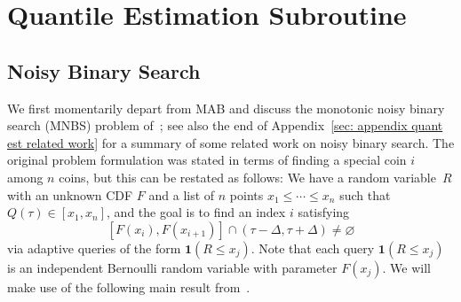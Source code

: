 \section{Quantile Estimation Subroutine}
\label{sec: appendix QuantEst}

\subsection{Noisy Binary Search}
\label{sec: appendix MNBS reformulation}
We first momentarily depart from MAB and discuss the monotonic noisy binary search (MNBS) problem of~\cite{karp2007noisy}; see also the end of Appendix~\ref{sec: appendix quant est related work} for a summary of some related work on noisy binary search.
The original problem formulation was stated in terms of finding a special coin $i$ among $n$ coins, but this can be restated as follows: 
We have a random variable~$R$ with an unknown CDF $F$ and a list of $n$ points $x_1  \le \cdots \le x_n$ such that $Q(\tau) \in [x_1, x_n]$, and the goal is to find an index $i$  satisfying 
\begin{equation}
\label{eq: MNBS guarantee}
    [F(x_i), F(x_{i+1})] \cap  (\tau - \Delta, \tau + \Delta) \ne 
    \varnothing
\end{equation}
via adaptive queries of the form $\mathbf{1}(R \le x_j)$. Note that each query $\mathbf{1}(R \le x_j)$ is an independent Bernoulli random variable with parameter $F(x_j)$.
We will make use of the following main result from~\cite[Theorem 1.1]{gretta2023sharp}.

